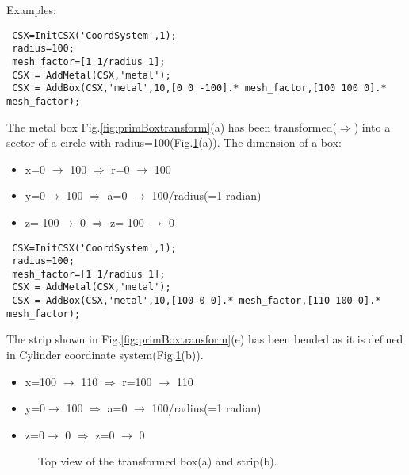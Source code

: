 \begin{FontDescr}{Examples:}
\begin{lstlisting} 
 CSX=InitCSX('CoordSystem',1);
 radius=100;
 mesh_factor=[1 1/radius 1];
 CSX = AddMetal(CSX,'metal'); 
 CSX = AddBox(CSX,'metal',10,[0 0 -100].* mesh_factor,[100 100 0].* mesh_factor);
\end{lstlisting}

The metal box Fig.\ref{fig:primBoxtransform}(a) has been transformed($\Rightarrow $) into a sector of a circle with radius=100(Fig.\ref{fig:box in cyl}(a)). The dimension of a box: 

\begin{itemize}
\item x=0 $\rightarrow$ 100    $\Rightarrow $   r=0 $\rightarrow$ 100

\item y=0$\rightarrow$ 100     $\Rightarrow $   a=0 $\rightarrow$ 100/radius(=1 radian)

\item z=-100$\rightarrow$ 0   $\Rightarrow $   z=-100 $\rightarrow$ 0
\end{itemize}            

\begin{lstlisting} 
 CSX=InitCSX('CoordSystem',1);
 radius=100;
 mesh_factor=[1 1/radius 1];
 CSX = AddMetal(CSX,'metal'); 
 CSX = AddBox(CSX,'metal',10,[100 0 0].* mesh_factor,[110 100 0].* mesh_factor);
\end{lstlisting}

The strip shown in Fig.\ref{fig:primBoxtransform}(e) has been bended as it is  defined in Cylinder coordinate system(Fig.\ref{fig:box in cyl}(b)).   

\begin{itemize}
\item x=100 $\rightarrow$ 110    $\Rightarrow $   r=100 $\rightarrow$ 110

\item y=0$\rightarrow$ 100     $\Rightarrow $   a=0 $\rightarrow$ 100/radius(=1 radian)

\item z=0$\rightarrow$ 0   $\Rightarrow $   z=0 $\rightarrow$ 0
\end{itemize}  

\begin{figure}[hbt]

\centering
{}
\caption{Top view of the transformed box(a) and strip(b).}
\label{fig:box in cyl}
\end{figure}

\end{FontDescr}


